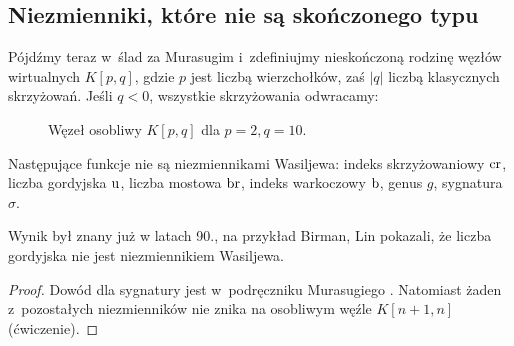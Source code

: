 
\subsection{Niezmienniki, które nie są skończonego typu}
Pójdźmy teraz w~ślad za Murasugim i~zdefiniujmy nieskończoną rodzinę węzłów wirtualnych $K[p, q]$, gdzie $p$ jest liczbą wierzchołków, zaś $|q|$ liczbą klasycznych skrzyżowań.
Jeśli $q < 0$, wszystkie skrzyżowania odwracamy:
\begin{figure}[H]
    \centering
\begin{comment}
    \begin{tikzpicture}[baseline=-0.65ex, scale=0.1]
    \begin{knot}[clip width=5, end tolerance=1pt, flip crossing/.list={2}]
        \draw[thick] (5, 0) [in=-60, out=-120] to (-5, 0) [in=60, out=120] to (-15, 0) [in=-60, out=-120] to (-25, 0) [in=60, out=120] to (-35, 0) [in=180, out=-120] to (-35, -10);
        \draw[thick] (5, 0) [in=60, out=120] to (-5, 0) [in=-60, out=-120] to (-15, 0) [in=60, out=120] to (-25, 0) [in=-60, out=-120] to (-35, 0) [in=-180, out=120] to (-35, 10);
        \strand[thick] (5, 0) [in=120, out=60] to (15, 0) [in=-120, out=-60] to (25, 0) [in=120, out=60] to (35, 0) [in=0, out=-60] to (35, -10);
        \strand[thick] (5, 0) [in=-120, out=-60] to (15, 0) [in=120, out=60] to (25, 0) [in=-120, out=-60] to (35, 0) [in=0, out=60] to (35, 10);
        \draw[thick,Latex-] (-35, 10) to (35, 10);
        \draw[thick,Latex-] (-35, -10) to (35, -10);
        \draw[black,fill=black] (5,0) circle (0.5);
        \draw[black,fill=black] (-5,0) circle (0.5);
        \draw[black,fill=black] (-15,0) circle (0.5);
        \draw[black,fill=black] (-25,0) circle (0.5);
        \draw[black,fill=black] (-35,0) circle (0.5);
    \end{knot}
    \end{tikzpicture}
\end{comment}
    \caption{Węzeł osobliwy $K[p, q]$ dla $p = 2, q = 10$.}
\end{figure}

\begin{proposition}
%
%
%
%
%
%
    Następujące funkcje nie są niezmiennikami Wasiljewa: indeks skrzyżowaniowy $\operatorname{cr}$, liczba gordyjska $\operatorname{u}$, liczba mostowa $\operatorname{br}$, indeks warkoczowy $\operatorname{b}$, genus $g$, sygnatura $\sigma$.
\end{proposition}

Wynik był znany już w latach 90., na przykład Birman, Lin \cite{birman93} pokazali, że liczba gordyjska nie jest niezmiennikiem Wasiljewa.
%
%

\begin{proof}
    Dowód dla sygnatury jest w~podręczniku Murasugiego \cite[s. 312]{murasugi96}.
    Natomiast żaden z~pozostałych niezmienników nie znika na osobliwym węźle $K[n+1, n]$ (ćwiczenie).
\end{proof}

